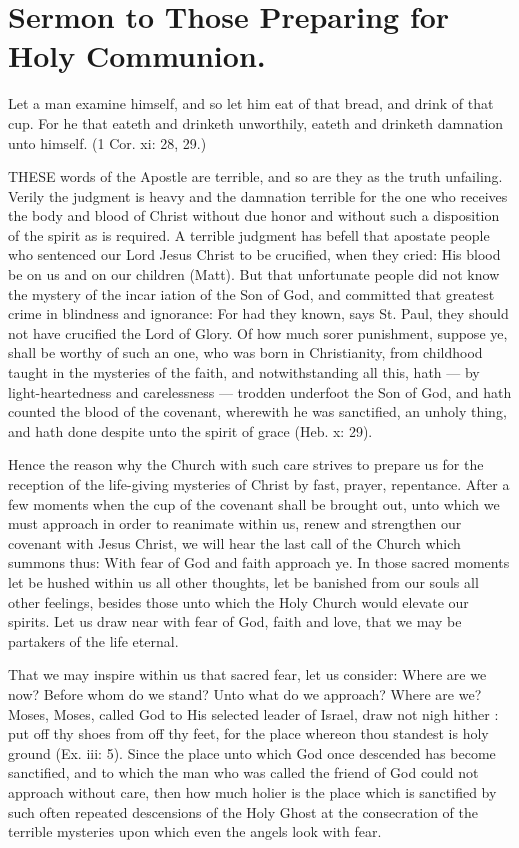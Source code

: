 \chapter{Sermon to Those Preparing for Holy Communion.}

Let a man examine himself, and so let him eat of that 
bread, and drink of that cup. For he that eateth and 
drinketh unworthily, eateth and drinketh damnation unto 
himself. (1 Cor. xi: 28, 29.) 

THESE words of the Apostle are terrible, 
and so are they as the truth unfailing. 
Verily the judgment is heavy and the damnation 
terrible for the one who receives the body and 
blood of Christ without due honor and without 
such a disposition of the spirit as is required. 
A terrible judgment has befell that apostate 
people who sentenced our Lord Jesus Christ to 
be crucified, when they cried: His blood be on 
us and on our children (Matt). But that unfortunate
people did not know the mystery of the 
incar iation of the Son of God, and committed 
that greatest crime in blindness and ignorance: 
For had they known, says St. Paul, they should 
not have crucified the Lord of Glory. Of how 
much sorer punishment, suppose ye, shall be 
worthy of such an one, who was born in Christianity,
from childhood taught in the mysteries 
of the faith, and notwithstanding all this, hath — 
by light-heartedness and carelessness — trodden 
underfoot the Son of God, and hath counted the 
blood of the covenant, wherewith he was sanctified,
an unholy thing, and hath done despite 
unto the spirit of grace (Heb. x: 29). 

Hence the reason why the Church with such 
care strives to prepare us for the reception of 
the life-giving mysteries of Christ by fast, prayer, 
repentance. After a few moments when the cup 
of the covenant shall be brought out, unto which 
we must approach in order to reanimate within 
us, renew and strengthen our covenant with 
Jesus Christ, we will hear the last call of the 
Church which summons thus: With fear of 
God and faith approach ye. In those sacred 
moments let be hushed within us all other 
thoughts, let be banished from our souls all 
other feelings, besides those unto which the 
Holy Church would elevate our spirits. Let us 
draw near with fear of God, faith and love, 
that we may be partakers of the life eternal. 

That we may inspire within us that sacred 
fear, let us consider: Where are we now? Before
whom do we stand? Unto what do we approach?
Where are we? Moses, Moses, called 
God to His selected leader of Israel, draw not 
nigh hither : put off thy shoes from off thy feet, 
for the place whereon thou standest is holy
ground (Ex. iii: 5). Since the place unto which 
God once descended has become sanctified, and 
to which the man who was called the friend of 
God could not approach without care, then how 
much holier is the place which is sanctified by 
such often repeated descensions of the Holy 
Ghost at the consecration of the terrible mysteries
upon which even the angels look with fear. 

